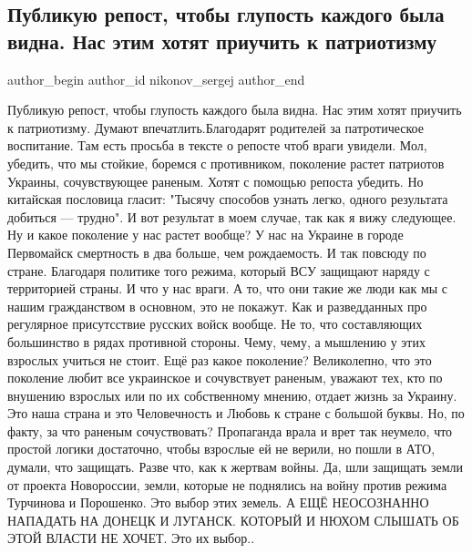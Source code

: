  
 
 
 
 
 
\subsection{Публикую репост, чтобы глупость каждого была видна. Нас этим хотят приучить к патриотизму}
\label{sec:16_10_2021.fb.nikonov_sergej.1.glupost_patriotizm}
 
\ifcmt
 author_begin
   author_id nikonov_sergej
 author_end
\fi

Публикую репост, чтобы глупость каждого была видна. Нас этим хотят приучить к
патриотизму. Думают впечатлить.Благодарят родителей за патротическое
воспитание. Там есть просьба в тексте о репосте чтоб враги увидели. Мол,
убедить, что мы стойкие, боремся с противником, поколение растет патриотов
Украины, сочувствующее раненым.  Хотят с помощью репоста убедить. Но китайская
пословица гласит: "Тысячу способов узнать легко, одного результата добиться —
трудно". И вот результат в моем случае, так как я вижу следующее. Ну и какое
поколение у нас растет вообще? У нас на Украине в городе Первомайск смертность
в два больше, чем рождаемость. И так повсюду по стране. Благодаря политике того
режима, который ВСУ защищают наряду с территорией страны. И что у нас враги. А
то, что они такие же люди как мы с нашим гражданством в основном, это не
покажут. Как и разведданных про регулярное присутсствие русских войск вообще.
Не то, что составляющих большинство в рядах противной стороны. Чему, чему, а
мышлению у этих взрослых учиться не стоит. Ещё раз какое поколение?
Великолепно, что это поколение любит все украинское и сочувствует раненым,
уважают тех, кто по внушению взрослых или по их собственному мнению, отдает
жизнь за Украину. Это наша страна и это Человечность и Любовь к стране с
большой буквы. Но, по факту, за что раненым сочуствовать? Пропаганда врала и
врет так неумело, что простой логики достаточно, чтобы взрослые ей не верили,
но пошли в АТО, думали, что защищать. Разве что, как к жертвам войны.  Да, шли
защищать земли от проекта Новороссии, земли, которые не поднялись на войну
против режима Турчинова и Порошенко. Это выбор этих земель. А ЕЩЁ НЕОСОЗНАННО
НАПАДАТЬ НА ДОНЕЦК И ЛУГАНСК. КОТОРЫЙ И НЮХОМ СЛЫШАТЬ ОБ ЭТОЙ ВЛАСТИ НЕ ХОЧЕТ.
Это их выбор..

